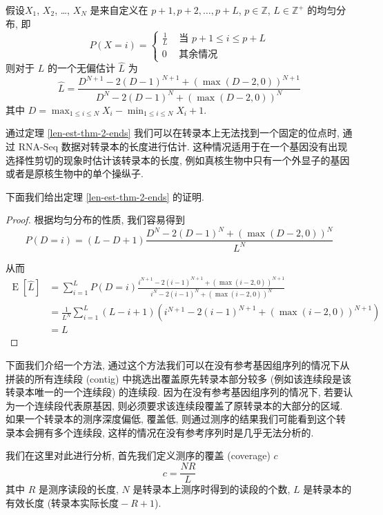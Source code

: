 \begin{thm}
\label{len-est-thm-2-ends}
假设$X_1$, $X_2$, \ldots, $X_N$ 是来自定义在 
${p+1, p+2, \ldots , p+L}$, $p \in \mathbb{Z}$, $L \in \mathbb{Z}^+$ 的均匀分布, 
即 
\[
P(X = i) =  \begin{cases}
\frac{1}{L} & \text{ 当 } p+1 \leq i \leq p+L \\
0 & \text{ 其余情况 }
\end{cases}
\]
则对于 $L$ 的一个无偏估计 $\hat{L}$ 为
\begin{equation}
\label{len-est-thm-2-ends-eq}
\hat{L} = \frac{ D^{N+1} - 2 (D-1)^{N+1} + (\max(D-2, 0))^{N+1} }{ D^{N} - 2 (D-1)^{N} + (\max(D-2, 0))^{N} }
\end{equation}
其中 $D = \max_{1 \leq i \leq N} X_i - \min_{1 \leq i \leq N} X_i +1$. 
\end{thm}

通过定理 \ref{len-est-thm-2-ends} 我们可以在转录本上无法找到一个固定的位点时, 
通过 RNA-Seq 数据对转录本的长度进行估计. 
这种情况适用于在一个基因没有出现选择性剪切的现象时估计该转录本的长度, 
例如真核生物中只有一个外显子的基因或者是原核生物中的单个操纵子. 

下面我们给出定理 \ref{len-est-thm-2-ends} 的证明. 

\begin{proof}
根据均匀分布的性质, 我们容易得到
\[
P(D=i) = (L-D +1) \frac{ D^N - 2 (D-1)^N  + (\max(D-2,0))^N}{ L^N }
\]

从而
\begin{align*}
\operatorname{E}[\hat{L}] &= \sum_{i=1}^L P(D=i) 
    \frac{i^{N+1}-2(i-1)^{N+1}+(\max(i-2,0))^{N+1}}{i^N-2(i-1)^N+(\max(i-2,0))^N} \\
&= \frac{1}{L^N} \sum_{i=1}^L (L-i+1)(i^{N+1}-2(i-1)^{N+1}+(\max(i-2,0))^{N+1}) \\
&= L
\end{align*}

\end{proof}

下面我们介绍一个方法, 
通过这个方法我们可以在没有参考基因组序列的情况下从拼装的所有连续段 (contig) 
中挑选出覆盖原先转录本部分较多 (例如该连续段是该转录本唯一的一个连续段) 的连续段. 
因为在没有参考基因组序列的情况下, 若要认为一个连续段代表原基因, 
则必须要求该连续段覆盖了原转录本的大部分的区域. 
如果一个转录本的测序深度偏低, 覆盖低, 
则通过测序的结果我们可能看到这个转录本会拥有多个连续段, 
这样的情况在没有参考序列时是几乎无法分析的. 

我们在这里对此进行分析, 首先我们定义测序的覆盖 (coverage) $c$
\begin{equation}
c = \frac{NR}{L}
\end{equation}
其中 $R$ 是测序读段的长度, $N$ 是转录本上测序时得到的读段的个数, 
$L$ 是转录本的有效长度 ($\text{转录本实际长度} -R+1$). 

